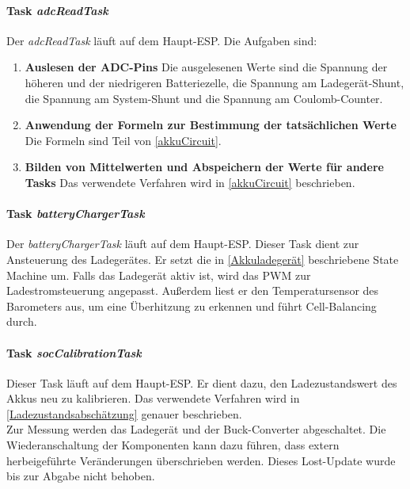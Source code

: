 \paragraph{Task \textit{adcReadTask}}
Der \textit{adcReadTask} läuft auf dem Haupt-ESP.
Die Aufgaben sind:
\begin{enumerate}
    \item \textbf{Auslesen der ADC-Pins}\newline
          Die ausgelesenen Werte sind die Spannung der höheren und der niedrigeren Batteriezelle, die Spannung am Ladegerät-Shunt, die Spannung am System-Shunt und die Spannung am Coulomb-Counter.
    \item \textbf{Anwendung der Formeln zur Bestimmung der tatsächlichen Werte}\newline
          Die Formeln sind Teil von \autoref{akkuCircuit}.
    \item \textbf{Bilden von Mittelwerten und Abspeichern der Werte für andere Tasks}\newline
          Das verwendete Verfahren wird in \autoref{akkuCircuit} beschrieben.
\end{enumerate}

\paragraph{Task \textit{batteryChargerTask}}
Der \textit{batteryChargerTask} läuft auf dem Haupt-ESP.
Dieser Task dient zur Ansteuerung des Ladegerätes.
Er setzt die in \autoref{Akkuladegerät} beschriebene State Machine um.
Falls das Ladegerät aktiv ist, wird das PWM zur Ladestromsteuerung angepasst.
Außerdem liest er den Temperatursensor des Barometers aus, um eine Überhitzung zu erkennen und führt Cell-Balancing durch.

\paragraph{Task \textit{socCalibrationTask}}
Dieser Task läuft auf dem Haupt-ESP.
Er dient dazu, den Ladezustandswert des Akkus neu zu kalibrieren.
Das verwendete Verfahren wird in \autoref{Ladezustandsabschätzung} genauer beschrieben.\\
Zur Messung werden das Ladegerät und der Buck-Converter abgeschaltet.
Die Wiederanschaltung der Komponenten kann dazu führen, dass extern herbeigeführte Veränderungen überschrieben werden.
Dieses Lost-Update wurde bis zur Abgabe nicht behoben.

